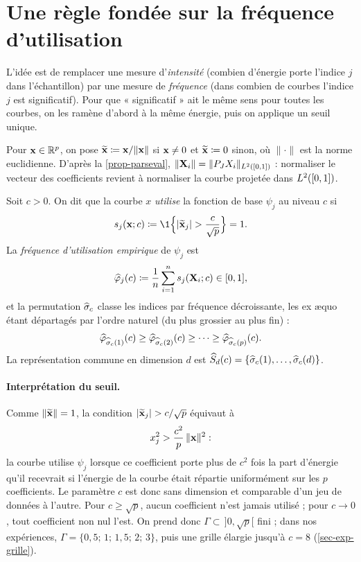 \section{Une règle fondée sur la fréquence d'utilisation}\label{sec-usage}

L'idée est de remplacer une mesure d'\emph{intensité} (combien d'énergie porte l'indice $j$ dans l'échantillon) par une mesure de \emph{fréquence} (dans combien de courbes l'indice $j$ est significatif). Pour que « significatif » ait le même sens pour toutes les courbes, on les ramène d'abord à la même énergie, puis on applique un seuil unique.

\begin{definition}[Normalisation]\label{def-normalisation}
Pour $\mathbf{x}\in\mathbb{R}^p$, on pose $\widetilde{\mathbf{x}}\coloneqq\mathbf{x}/\|\mathbf{x}\|$ si $\mathbf{x}\neq0$ et $\widetilde{\mathbf{x}}\coloneqq0$ sinon, où $\|\cdot\|$ est la norme euclidienne. D'après la \cref{prop-parseval}, $\|\mathbf{X}_i\|=\|P_JX_i\|_{L^2([0,1])}$ : normaliser le vecteur des coefficients revient à normaliser la courbe projetée dans $L^2([0,1])$.
\end{definition}

\begin{definition}\label{def-usage}
Soit $c>0$. On dit que la courbe $x$ \emph{utilise} la fonction de base $\psi_j$ au niveau $c$ si
\begin{equation}\label{eq-indicatrice}
  s_j(\bx;c)\eqdef\1\Bigl\{|\tx_j|>\frac{c}{\sqrt p}\Bigr\}=1 .
\end{equation}
La \emph{fréquence d'utilisation empirique} de $\psi_j$ est
\begin{equation}\label{eq-usage}
  \widehat{\varphi}_j(c)\coloneqq\frac1n\sum_{i=1}^n s_j(\mathbf{X}_i;c)\in[0,1],
\end{equation}
et la permutation $\widehat{\sigma}_c$ classe les indices par fréquence décroissante, les ex æquo étant départagés par l'ordre naturel (du plus grossier au plus fin) :
\[
  \widehat{\varphi}_{\widehat{\sigma}_c(1)}(c)\ge\widehat{\varphi}_{\widehat{\sigma}_c(2)}(c)\ge\dots\ge\widehat{\varphi}_{\widehat{\sigma}_c(p)}(c).
\]
La représentation commune en dimension $d$ est $\widehat{S}_d(c)=\{\widehat{\sigma}_c(1),\dots,\widehat{\sigma}_c(d)\}$.
\end{definition}

\paragraph{Interprétation du seuil.} Comme $\|\widetilde{\mathbf{x}}\|=1$, la condition $|\tx_j|>c/\sqrt p$ équivaut à
\[
  x_j^2>\frac{c^2}{p}\,\|\mathbf{x}\|^2 :
\]
la courbe utilise $\psi_j$ lorsque ce coefficient porte plus de $c^2$ fois la part d'énergie qu'il recevrait si l'énergie de la courbe était répartie uniformément sur les $p$ coefficients. Le paramètre $c$ est donc sans dimension et comparable d'un jeu de données à l'autre. Pour $c\ge\sqrt p$, aucun coefficient n'est jamais utilisé ; pour $c\to0$, tout coefficient non nul l'est. On prend donc $\Gamma\subset\,]0,\sqrt p[$ fini ; dans nos expériences, $\Gamma=\{0{,}5;\,1;\,1{,}5;\,2;\,3\}$, puis une grille élargie jusqu'à $c=8$ (\cref{sec-exp-grille}).


